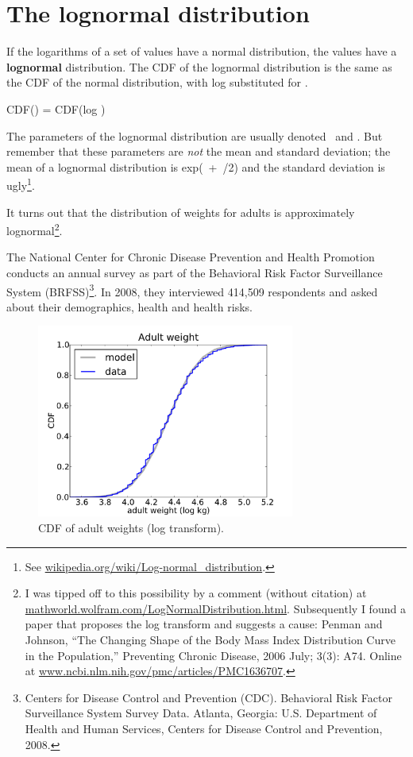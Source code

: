 \documentclass[12pt]{book}
\begin{document}
\section{The lognormal distribution}
\label{lognormal}

If the logarithms of a set of values have a normal distribution, the
values have a {\bf lognormal} distribution.  The CDF of the lognormal
distribution is the same as the CDF of the normal distribution,
with log \x substituted for \x.

\quad CDF(\x) = CDF(log \x)
 
The parameters of the lognormal distribution are usually denoted
\mymu~and \mysigma.  But remember that these parameters are {\em not}
the mean and standard deviation; the mean of a lognormal distribution
is exp(\mymu~+~\sigmasq/2) and the standard deviation is
ugly\footnote{See \url{wikipedia.org/wiki/Log-normal_distribution}.}.
  

It turns out that the distribution of weights for adults is
approximately lognormal\footnote{I was tipped off to this possibility by a
  comment (without citation) at
  \url{mathworld.wolfram.com/LogNormalDistribution.html}.
  Subsequently I found a paper that proposes the log transform and
  suggests a cause: Penman and Johnson, ``The Changing Shape of the
  Body Mass Index Distribution Curve in the Population,'' Preventing
  Chronic Disease, 2006 July; 3(3): A74.  Online
  at \url{www.ncbi.nlm.nih.gov/pmc/articles/PMC1636707}.}.

The National Center for Chronic Disease
Prevention and Health Promotion conducts an annual survey as part of
the Behavioral Risk Factor Surveillance System
(BRFSS)\footnote{Centers for Disease Control and Prevention
  (CDC). Behavioral Risk Factor Surveillance System Survey
  Data. Atlanta, Georgia: U.S. Department of Health and Human
  Services, Centers for Disease Control and Prevention, 2008.}.  In
2008, they interviewed 414,509 respondents and asked about their
demographics, health and health risks.


\begin{figure}
\centerline{
\includegraphics[height=2.5in]{figs/brfss_weight_log.pdf}
}
\caption{CDF of adult weights (log
  transform).}
\label{brfss_weight_log}
\end{figure}
\end{document}
